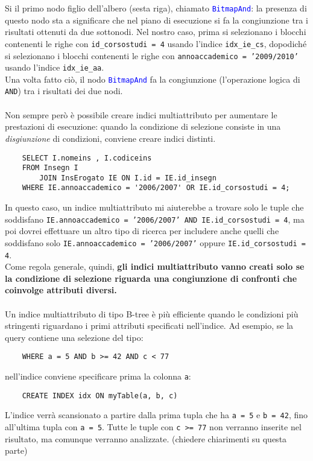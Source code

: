 \documentclass[12pt,a4paper]{book}
\begin{document}
	Si il primo nodo figlio dell'albero (sesta riga), chiamato \textcolor{blue}{\texttt{BitmapAnd}}: la presenza di questo nodo sta a significare che nel piano di esecuzione si fa la congiunzione tra i risultati ottenuti da due sottonodi. Nel nostro caso, prima si selezionano i blocchi contenenti le righe con \texttt{id_corsostudi = 4} usando l'indice \texttt{idx_ie_cs}, dopodiché si selezionano i blocchi contenenti le righe con \texttt{annoaccademico = '2009/2010'} usando l'indice \texttt{idx_ie_aa}.\\
	Una volta fatto ciò, il nodo \textcolor{blue}{\texttt{BitmapAnd}} fa la congiunzione (l'operazione logica di \texttt{AND}) tra i risultati dei due nodi.
	\paragraph{}Non sempre però è possibile creare indici multiattributo per aumentare le prestazioni di esecuzione: quando la condizione di selezione consiste in una \textit{disgiunzione} di condizioni, conviene creare indici distinti.
	\begin{lstlisting}
	SELECT I.nomeins , I.codiceins 
	FROM Insegn I
		JOIN InsErogato IE ON I.id = IE.id_insegn 
	WHERE IE.annoaccademico = '2006/2007' OR IE.id_corsostudi = 4;
	\end{lstlisting}
	In questo caso, un indice multiattributo mi aiuterebbe a trovare solo le tuple che soddisfano \texttt{IE.annoaccademico = '2006/2007' AND IE.id_corsostudi = 4}, ma poi dovrei effettuare un altro tipo di ricerca per includere anche quelli che soddisfano solo \texttt{IE.annoaccademico = '2006/2007'} oppure \texttt{IE.id_corsostudi = 4}.\\Come regola generale, quindi, \textbf{gli indici multiattributo vanno creati solo se la condizione di selezione riguarda una congiunzione di confronti che coinvolge attributi diversi.}
	\paragraph{}Un indice multiattributo di tipo B-tree è più  efficiente quando le condizioni più stringenti riguardano i primi attributi specificati nell'indice. Ad esempio, se la query contiene una selezione del tipo:
	\begin{lstlisting}
	WHERE a = 5 AND b >= 42 AND c < 77
	\end{lstlisting}
	nell'indice conviene specificare prima la colonna \texttt{a}:
	\begin{lstlisting}
	CREATE INDEX idx ON myTable(a, b, c)
	\end{lstlisting}
	L'indice verrà scansionato a partire dalla prima tupla che ha \texttt{a = 5} e \texttt{b = 42}, fino all'ultima tupla con \texttt{a = 5}. Tutte le tuple con \texttt{c >= 77} non verranno inserite nel risultato, ma comunque verranno analizzate. (chiedere chiarimenti su questa parte)  
\end{document}
